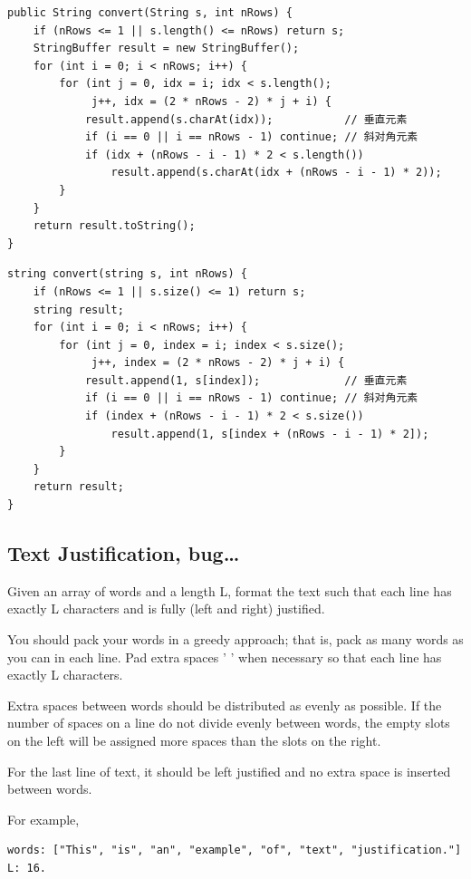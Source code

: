 \documentclass[12pt]{book}
\begin{document}
\lstset{language=java,label= ,caption= ,numbers=none}
\begin{lstlisting}
public String convert(String s, int nRows) {
    if (nRows <= 1 || s.length() <= nRows) return s;
    StringBuffer result = new StringBuffer();
    for (int i = 0; i < nRows; i++) {
        for (int j = 0, idx = i; idx < s.length();
             j++, idx = (2 * nRows - 2) * j + i) {
            result.append(s.charAt(idx));           // 垂直元素
            if (i == 0 || i == nRows - 1) continue; // 斜对角元素
            if (idx + (nRows - i - 1) * 2 < s.length())
                result.append(s.charAt(idx + (nRows - i - 1) * 2));
        }
    }
    return result.toString();
}
\end{lstlisting}
\lstset{language=java,label= ,caption= ,numbers=none}
\begin{lstlisting}
string convert(string s, int nRows) {
    if (nRows <= 1 || s.size() <= 1) return s;
    string result;
    for (int i = 0; i < nRows; i++) {
        for (int j = 0, index = i; index < s.size();
             j++, index = (2 * nRows - 2) * j + i) {
            result.append(1, s[index]);             // 垂直元素
            if (i == 0 || i == nRows - 1) continue; // 斜对角元素
            if (index + (nRows - i - 1) * 2 < s.size())
                result.append(1, s[index + (nRows - i - 1) * 2]);
        }
    }
    return result;
}
\end{lstlisting}

\subsection{Text Justification, bug\ldots{}}
\label{sec-20-1-12}
Given an array of words and a length L, format the text such that each line has exactly L characters and is fully (left and right) justified.

You should pack your words in a greedy approach; that is, pack as many words as you can in each line. Pad extra spaces ' ' when necessary so that each line has exactly L characters.

Extra spaces between words should be distributed as evenly as possible. If the number of spaces on a line do not divide evenly between words, the empty slots on the left will be assigned more spaces than the slots on the right.

For the last line of text, it should be left justified and no extra space is inserted between words.

For example,
\lstset{language=java,label= ,caption= ,numbers=none}
\begin{lstlisting}
words: ["This", "is", "an", "example", "of", "text", "justification."]
L: 16.
\end{lstlisting}
\end{document}
